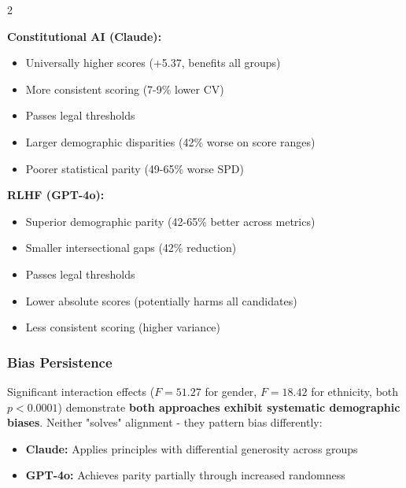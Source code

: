 \documentclass{article}
\begin{document}
\begin{multicols}{2}

\textbf{Constitutional AI (Claude):}
\begin{itemize}
    \item[$+$] Universally higher scores (+5.37, benefits all groups)
    \item[$+$] More consistent scoring (7-9\% lower CV)
    \item[$+$] Passes legal thresholds
    \item[$-$] Larger demographic disparities (42\% worse on score ranges)
    \item[$-$] Poorer statistical parity (49-65\% worse SPD)
\end{itemize}

\columnbreak

\textbf{RLHF (GPT-4o):}
\begin{itemize}
    \item[$+$] Superior demographic parity (42-65\% better across metrics)
    \item[$+$] Smaller intersectional gaps (42\% reduction)
    \item[$+$] Passes legal thresholds
    \item[$-$] Lower absolute scores (potentially harms all candidates)
    \item[$-$] Less consistent scoring (higher variance)
\end{itemize}

\end{multicols}

\subsubsection{Bias Persistence}

Significant interaction effects ($F=51.27$ for gender, $F=18.42$ for ethnicity, both $p<0.0001$) demonstrate \textbf{both approaches exhibit systematic demographic biases}. Neither "solves" alignment - they pattern bias differently:

\begin{itemize}
    \item \textbf{Claude:} Applies principles with differential generosity across groups
    \item \textbf{GPT-4o:} Achieves parity partially through increased randomness
\end{itemize}
\end{document}
